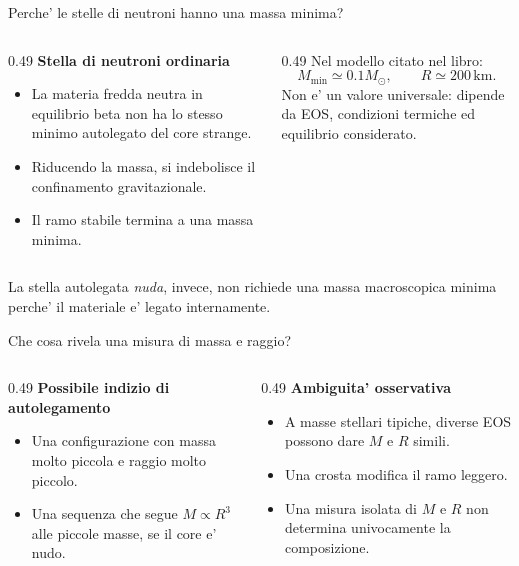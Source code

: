 \begin{frame}{Perche' le stelle di neutroni hanno una massa minima?}
\small
\begin{columns}[T,onlytextwidth]
\begin{column}{0.49\textwidth}
\textbf{Stella di neutroni ordinaria}
\begin{itemize}
\item La materia fredda neutra in equilibrio beta non ha lo stesso minimo autolegato del core strange.
\item Riducendo la massa, si indebolisce il confinamento gravitazionale.
\item Il ramo stabile termina a una massa minima.
\end{itemize}
\end{column}
\begin{column}{0.49\textwidth}
Nel modello citato nel libro:
\[
M_{\min}\simeq0.1M_\odot,
\qquad R\simeq200\,\mathrm{km}.
\]
Non e' un valore universale: dipende da EOS, condizioni termiche ed equilibrio considerato.
\end{column}
\end{columns}
\medskip
La stella autolegata \emph{nuda}, invece, non richiede una massa macroscopica minima perche' il materiale e' legato internamente.
\end{frame}

\begin{frame}{Che cosa rivela una misura di massa e raggio?}
\small
\begin{columns}[T,onlytextwidth]
\begin{column}{0.49\textwidth}
\textbf{Possibile indizio di autolegamento}
\begin{itemize}
\item Una configurazione con massa molto piccola e raggio molto piccolo.
\item Una sequenza che segue $M\propto R^3$ alle piccole masse, se il core e' nudo.
\end{itemize}
\end{column}
\begin{column}{0.49\textwidth}
\textbf{Ambiguita' osservativa}
\begin{itemize}
\item A masse stellari tipiche, diverse EOS possono dare $M$ e $R$ simili.
\item Una crosta modifica il ramo leggero.
\item Una misura isolata di $M$ e $R$ non determina univocamente la composizione.
\end{itemize}
\end{column}
\end{columns}
\end{frame}

